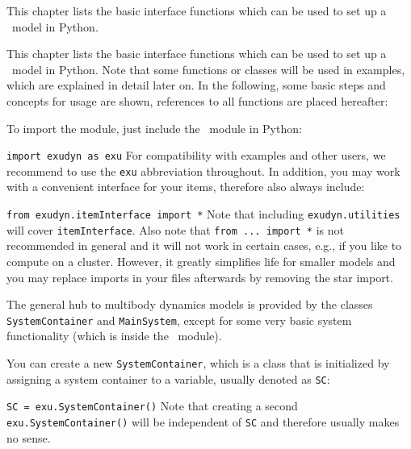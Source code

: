 
\label{sec:PCpp:command:interface}

This chapter lists the basic interface functions which can be used to set up a \codeName\ model in Python.

\label{sec:generalPythonInterface}
This chapter lists the basic interface functions which can be used to set up 
a \codeName\ model in Python. Note that some functions or classes will be used in examples, which are explained in detail later on.
In the following, some basic steps and concepts for usage are shown, references to all functions are placed hereafter:

To import the module, just include the \codeName\ module in Python:
\bi
\item[] \texttt{import exudyn as exu}
\ei
For compatibility with examples and other users, we recommend to use the \texttt{exu} abbreviation throughout. In addition, you may work with a convenient interface for your items, therefore also always include:
\bi
\item[] \texttt{from exudyn.itemInterface import *}
\ei
Note that including \texttt{exudyn.utilities} will cover \texttt{itemInterface}. Also note that \texttt{from ... import *} is not recommended in general and it will not work in certain cases, e.g., if you like to compute on a cluster. However, it greatly simplifies life for smaller models and you may replace imports in your files afterwards by removing the star import.

The general hub to multibody dynamics models is provided by the classes \texttt{SystemContainer} and \texttt{MainSystem}, except for some very basic system functionality (which is inside the \codeName\ module). 

You can create a new \texttt{SystemContainer}, which is a class that is initialized by assigning a system container to a variable, usually denoted as \texttt{SC}:
\bi
\item[] \texttt{SC = exu.SystemContainer()}
\ei
Note that creating a second \texttt{exu.SystemContainer()} will be independent of \texttt{SC} and therefore usually makes no sense.

